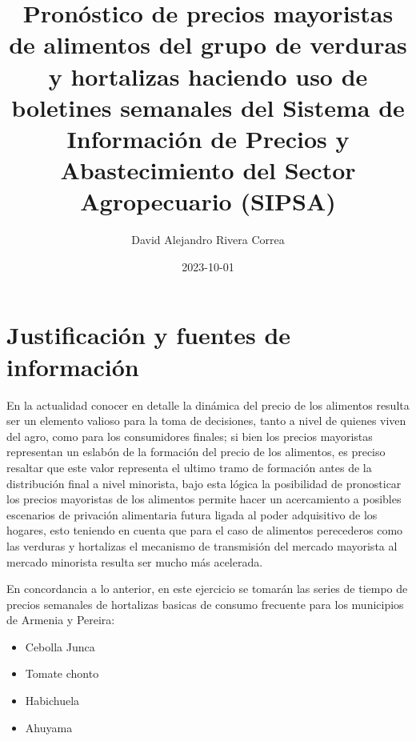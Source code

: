 \documentclass[
]{book}
\title{Pronóstico de precios mayoristas de alimentos del grupo de verduras y hortalizas haciendo uso de boletines semanales del Sistema de Información de Precios y Abastecimiento del Sector Agropecuario (SIPSA)}
\author{David Alejandro Rivera Correa}
\date{2023-10-01}
\providecommand{\tightlist}{%
  \setlength{\itemsep}{0pt}\setlength{\parskip}{0pt}}
\begin{document}
\maketitle

{
\setcounter{tocdepth}{1}
\tableofcontents
}
\hypertarget{justificaciuxf3n-y-fuentes-de-informaciuxf3n}{%
\chapter{Justificación y fuentes de información}\label{justificaciuxf3n-y-fuentes-de-informaciuxf3n}}

En la actualidad conocer en detalle la dinámica del precio de los alimentos resulta ser un elemento valioso para la toma de decisiones, tanto a nivel de quienes viven del agro, como para los consumidores finales; si bien los precios mayoristas representan un eslabón de la formación del precio de los alimentos, es preciso resaltar que este valor representa el ultimo tramo de formación antes de la distribución final a nivel minorista, bajo esta lógica la posibilidad de pronosticar los precios mayoristas de los alimentos permite hacer un acercamiento a posibles escenarios de privación alimentaria futura ligada al poder adquisitivo de los hogares, esto teniendo en cuenta que para el caso de alimentos perecederos como las verduras y hortalizas el mecanismo de transmisión del mercado mayorista al mercado minorista resulta ser mucho más acelerada.

En concordancia a lo anterior, en este ejercicio se tomarán las series de tiempo de precios semanales de hortalizas basicas de consumo frecuente para los municipios de Armenia y Pereira:

\begin{itemize}
\tightlist
\item
  Cebolla Junca
\item
  Tomate chonto
\item
  Habichuela
\item
  Ahuyama
\end{itemize}
\end{document}
